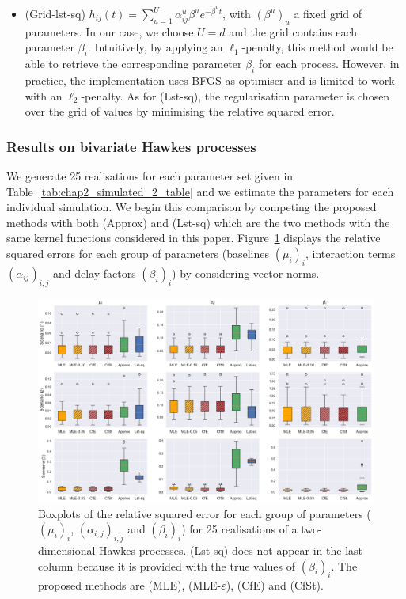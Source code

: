 \begin{enumerate}
\begin{itemize}
        \item (Grid-lst-sq) $h_{ij}(t) = \sum_{u=1}^{U}{\alpha_{ij}^u\beta^u e^{-\beta^u t}}$, with $(\beta^u)_u$ a fixed grid of parameters. In our case, we choose $U=d$ and the grid contains each parameter $\beta_{i}$. Intuitively, by applying an $\ell_1$-penalty, this method would be able to retrieve the corresponding parameter $\beta_{i}$ for each process.
        However, in practice, the implementation uses BFGS as optimiser and is limited to work with an $\ell_2$-penalty. As for (Lst-sq), the regularisation parameter is chosen over the grid of values by minimising the relative squared error.
    \end{itemize}
    \end{enumerate}


    \subsubsection{Results on bivariate Hawkes processes}\label{sec:chap2_dim2}

   We generate 25 realisations for each parameter set given in Table~\ref{tab:chap2_simulated_2_table} and we estimate the parameters for each individual simulation.  We begin this comparison by competing the proposed methods with both (Approx) and (Lst-sq) which are the two methods with the same kernel functions considered in this paper. Figure~\ref{fig:chap2_boxplots} displays the relative squared errors for each group of parameters (baselines $(\mu_i)_i$, interaction terms $(\alpha_{ij})_{i,j}$ and delay factors $(\beta_i)_i$)  by considering vector norms.
    
    {\begin{figure}[!ht]
    \centering
    \includegraphics[width=0.9\linewidth]{images/chapter3/boxplots2O.pdf}
    \caption{Boxplots of the relative squared error for each group of parameters ($(\mu_i)_i$, $(\alpha_{i,j})_{i,j}$ and $(\beta_i)_i$) for 25 realisations of a two-dimensional Hawkes processes.
    (Lst-sq) does not appear in the last column because it is provided with the true values of \((\beta_i)_i\).
    The proposed methods are (MLE), (MLE-$\varepsilon$), (CfE) and (CfSt).}
    \label{fig:chap2_boxplots}
    \end{figure}}
    

